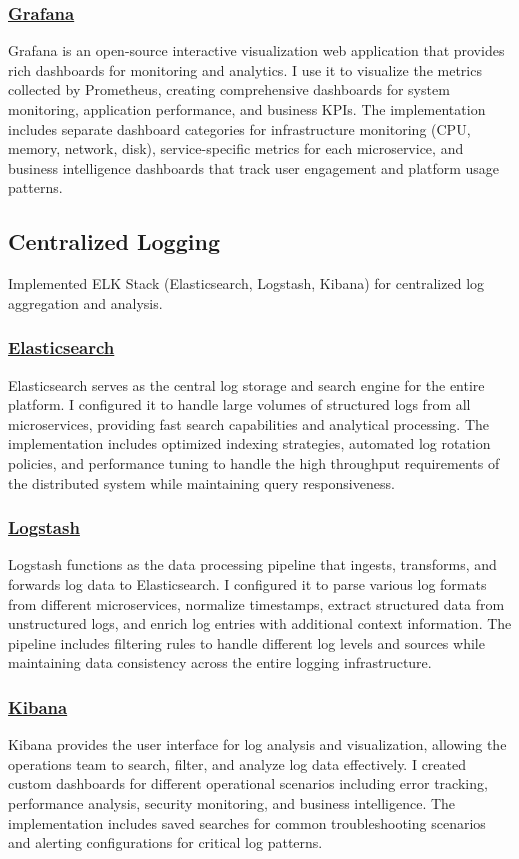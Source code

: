 \subsubsection*{\underline{Grafana}}
Grafana is an open-source interactive visualization web application that provides rich dashboards for monitoring and analytics. I use it to visualize the metrics collected by Prometheus, creating comprehensive dashboards for system monitoring, application performance, and business KPIs. The implementation includes separate dashboard categories for infrastructure monitoring (CPU, memory, network, disk), service-specific metrics for each microservice, and business intelligence dashboards that track user engagement and platform usage patterns.

\subsection{Centralized Logging}
Implemented ELK Stack (Elasticsearch, Logstash, Kibana) for centralized log aggregation and analysis.

\subsubsection*{\underline{Elasticsearch}}
Elasticsearch serves as the central log storage and search engine for the entire platform. I configured it to handle large volumes of structured logs from all microservices, providing fast search capabilities and analytical processing. The implementation includes optimized indexing strategies, automated log rotation policies, and performance tuning to handle the high throughput requirements of the distributed system while maintaining query responsiveness.

\subsubsection*{\underline{Logstash}}
Logstash functions as the data processing pipeline that ingests, transforms, and forwards log data to Elasticsearch. I configured it to parse various log formats from different microservices, normalize timestamps, extract structured data from unstructured logs, and enrich log entries with additional context information. The pipeline includes filtering rules to handle different log levels and sources while maintaining data consistency across the entire logging infrastructure.

\subsubsection*{\underline{Kibana}}
Kibana provides the user interface for log analysis and visualization, allowing the operations team to search, filter, and analyze log data effectively. I created custom dashboards for different operational scenarios including error tracking, performance analysis, security monitoring, and business intelligence. The implementation includes saved searches for common troubleshooting scenarios and alerting configurations for critical log patterns.

